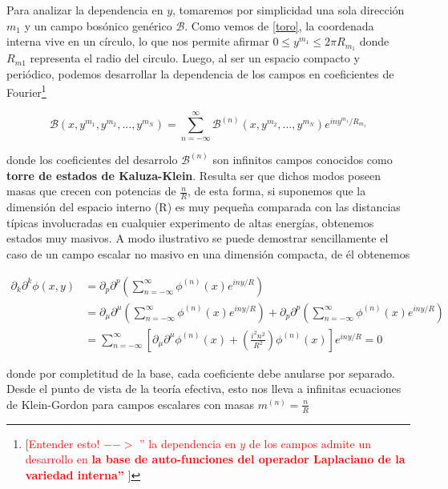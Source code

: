 \documentclass{article}
\numberwithin{equation}{section}
\begin{document}
Para analizar la dependencia en $ y $, tomaremos por simplicidad una sola dirección $ m_1 $ y un campo bosónico genérico $ \mathcal{B} $. Como vemos de \ref{toro}, la coordenada interna vive en un círculo, lo que nos permite afirmar $ 0\leq y^{m_1} \leq 2\pi R_{m_1}  $ donde $ R_{m1} $ representa el radio del circulo. Luego, al ser un espacio compacto y periódico, podemos desarrollar la dependencia de los campos en coeficientes de Fourier\footnote{[\textcolor{red}{Entender esto! $ --> $ '' la dependencia en $ y $ de los campos admite un desarrollo en \textbf{la base de auto-funciones del operador Laplaciano de la variedad interna''} }]}

\begin{equation}\label{fourier}
\mathcal{B} (x,y^{m_1},y^{m_2},...,y^{m_N}) = \sum_{n=-\infty}^{\infty} \mathcal{B}^{(n)}(x, y^{m_2},...,y^{m_N}) e^{i n y^{m_1}/ R_{m_1}}
\end{equation}
	
donde los coeficientes del desarrolo $ \mathcal{B}^{(n)} $ son infinitos campos conocidos como \textbf{torre de estados de Kaluza-Klein}. Resulta ser que dichos modos poseen masas que crecen con potencias de $ \frac{n}{R} $, de esta forma, si suponemos que la dimensión del espacio interno (R) es muy pequeña comparada con las distancias típicas involucradas en cualquier experimento de altas energías, obtenemos estados muy masivos. A modo ilustrativo se puede demostrar sencillamente el caso de un campo escalar no masivo en una dimensión compacta, de él obtenemos

\begin{equation}
\begin{aligned}
\partial_k \partial^k \phi (x,y) &= \partial_p \partial^p \left( \sum_{n=-\infty}^{\infty} \phi^{(n)}(x) e^{i n y / R} \right)\\
&= \partial_{\mu} \partial^{\mu}  \left( \sum_{n=-\infty}^{\infty} \phi^{(n)}(x) e^{i n y / R} \right) + \partial_p \partial^p  \left( \sum_{n=-\infty}^{\infty} \phi^{(n)}(x) e^{i n y / R} \right)\\
&= \sum_{n=-\infty}^{\infty} \left[ \partial_{\mu} \partial^{\mu} \phi^{(n)}(x) + \left(\frac{i^2 n^2}{R^2}\right) \phi^{(n)}(x) \right] e^{i n y / R} = 0
\end{aligned}
\end{equation}

donde por completitud de la base, cada coeficiente debe anularse por separado. Desde el punto de vista de la teoría efectiva, esto nos lleva a infinitas ecuaciones de Klein-Gordon para campos escalares con masas $ m^{(n)} = \frac{n}{R} $
\end{document}
